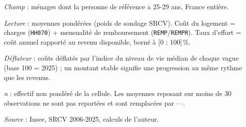 \documentclass[12pt,a4paper]{article}
\begin{document}
\begin{table}[htbp]
\begin{threeparttable}
\begin{tabular}{lrrrrrrrrrr}
			\bottomrule
		\end{tabular}
		\begin{tablenotes}[flushleft]\scriptsize
			\item \textit{Champ} : ménages dont la personne de référence a 25-29 ans, France entière.
			\item \textit{Lecture} : moyennes pondérées (poids de sondage SRCV). Coût du logement =
			charges (\texttt{HH070}) + mensualité de remboursement (\texttt{REMP}/\texttt{REMPR}).
			Taux d'effort = coût annuel rapporté au revenu disponible, borné à [0 ; 100]\,\%.
			\item \textit{Déflateur} : coûts déflatés par l'indice du niveau de vie médian de chaque vague (base 100 = 2025) ; un montant stable signifie une progression au même rythme que les revenus.
			\item \textit{n} : effectif non pondéré de la cellule. Les moyennes reposant sur
			moins de 30 observations ne sont pas reportées et sont remplacées par ---.
			\item \textit{Source} : Insee, SRCV 2006-2025, calculs de l'auteur.
		\end{tablenotes}
	\end{threeparttable}
\end{table}
\end{document}
